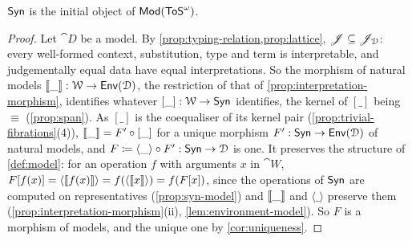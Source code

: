 \begin{theorem}\label{thm:initiality}
    $\mathsf{Syn}$ is the initial object of $\mathsf{Mod}(\mathsf{ToS}^\omega)$.
\end{theorem}

\begin{proof}
    Let $\cat{D}$ be a model. By \cref{prop:typing-relation,prop:lattice}, $\mathscr{J} \subseteq \mathscr{J}_{\mathcal{D}}$: every well-formed context, substitution, type and term is interpretable, and judgementally equal data have equal interpretations. So the morphism of natural models $\llbracket\_\rrbracket : \mathcal{W} \to \mathsf{Env}(\mathcal{D})$, the restriction of that of \cref{prop:interpretation-morphism}, identifies whatever $[\_] : \mathcal{W} \to \mathsf{Syn}$ identifies, the kernel of $[\_]$ being $\equiv$ (\cref{prop:span}). As $[\_]$ is the coequaliser of its kernel pair (\cref{prop:trivial-fibrations}(4)), $\llbracket\_\rrbracket = F' \circ [\_]$ for a unique morphism $F' : \mathsf{Syn} \to \mathsf{Env}(\mathcal{D})$ of natural models, and $F \coloneqq \langle \_ \rangle \circ F' : \mathsf{Syn} \to \mathcal{D}$ is one. It preserves the structure of \cref{def:model}: for an operation $f$ with arguments $x$ in $\cat{W}$, $F[f(x)] = \langle \llbracket f(x)\rrbracket \rangle = f(\langle \llbracket x\rrbracket \rangle) = f(F[x])$, since the operations of $\mathsf{Syn}$ are computed on representatives (\cref{prop:syn-model}) and $\llbracket\_\rrbracket$ and $\langle \_ \rangle$ preserve them (\cref{prop:interpretation-morphism}(ii), \cref{lem:environment-model}). So $F$ is a morphism of models, and the unique one by \cref{cor:uniqueness}.
\end{proof}
